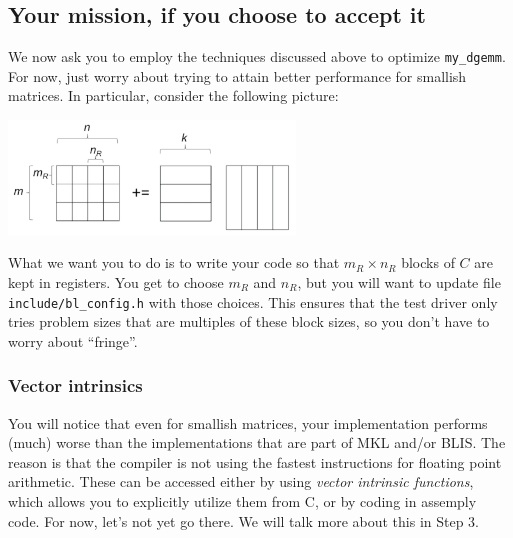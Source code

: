 \subsection{Your mission, if you choose to accept it}
\label{sec:two:mission}

We now ask you to employ the techniques discussed above to optimize {\tt my\_dgemm}.  For now, just worry about trying to attain better performance for smallish matrices.  In particular, consider the following picture:
\begin{center}
	\includegraphics[width=3in]{figures/Step2.pdf}
\end{center}
What we want you to do is to write your code so that $ m_R \times n_R $ blocks of $ C $ are kept in registers.  
You get to choose $ m_R $ and $ n_R $, but you will want to update file {\tt include/bl\_config.h} with those choices.
This ensures that the test driver only tries problem sizes that are multiples of these block sizes, so you don't have to worry about ``fringe''.

\subsubsection{Vector intrinsics}

You will notice that even for smallish matrices, your implementation performs (much) worse than the implementations that are part of MKL and/or BLIS.  
The reason is that the compiler is not using the fastest instructions for floating point arithmetic.  These can be accessed either by using {\em vector intrinsic functions}, which allows you to explicitly utilize them from C, or by coding in assemply code.  For now, let's not yet go there.  We will talk more about this in Step 3.

